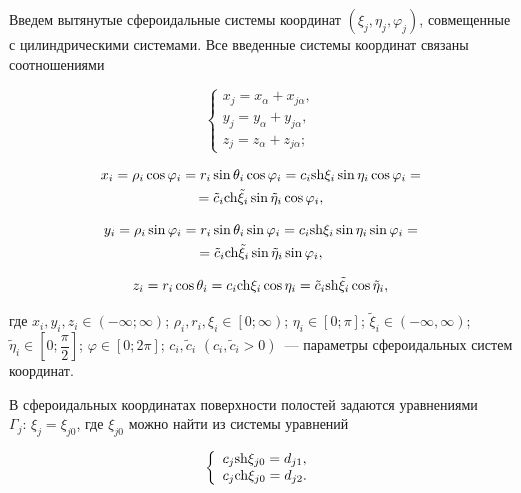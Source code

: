 \begin{russian}
Введем вытянутые сфероидальные системы координат $(\xi_j,\eta_j,\varphi_j)$, совмещенные с цилиндрическими системами. Все введенные системы координат связаны соотношениями 

\begin{equation}
\left\{ {\begin{array}{*{20}{l}}
{{x_j} = {x_\alpha} + {x_{j\alpha}},}\\
{{y_j} = {y_\alpha} + {y_{j\alpha}},}\\
{{z_j} = {z_\alpha} + {z_{j\alpha}};}
\end{array}} \right.
\end{equation}

\begin{multline}
{x_i} = {\rho _i}\cos {\varphi _i} = {r_i}\sin {\theta _i}\cos {\varphi _i} = {c_i}{\mathop{\rm sh}\nolimits} {\xi _i}\sin {\eta _i}\cos {\varphi _i} = \\
= {\tilde c_i}{\mathop{\rm ch}\nolimits} {\tilde \xi _i}\sin {\tilde \eta _i}\cos {\varphi _i},
\end{multline}

\begin{multline}
{y_i} = {\rho _i}\sin {\varphi _i} = {r_i}\sin {\theta _i}\sin {\varphi _i} = {c_i}{\mathop{\rm sh}\nolimits} {\xi _i}\sin {\eta _i}\sin {\varphi _i} = \\
= {\tilde c_i}{\mathop{\rm ch}\nolimits} {\tilde \xi _i}\sin {\tilde \eta _i}\sin {\varphi _i},
\end{multline}

\begin{equation}
{z_i} = {r_i}\cos {\theta _i} = {c_i}{\mathop{\rm ch}\nolimits} {\xi _i}\cos {\eta _i} = {\tilde c_i}{\mathop{\rm sh}\nolimits} {\tilde \xi _i}\cos {\tilde \eta _i},
\end{equation}

\noindent где ${x_i},{y_i},{z_i} \in \left( { - \infty ;\infty } \right)$; ${\rho _i},{r_i},{\xi _i} \in \left[ {\left. {0;\infty } \right)} \right.$; ${\eta _i} \in \left[ {0;\pi } \right]$; ${\tilde \xi _i} \in \left( { - \infty ,\infty } \right)$; ${\tilde \eta _i} \in \left[ {0;\dfrac{\pi }{2}} \right]$; $\varphi  \in \left[ {0;2\pi } \right]$; ${c_i},{\tilde c_i}$ $\left( {{c_i},{{\tilde c}_i} > 0} \right)$~--- параметры сфероидальных систем координат.


В сфероидальных координатах поверхности полостей задаются уравнениями $\Gamma_j:\,\xi_j=\xi_{j0}$, где $\xi_{j0}$ можно найти из системы уравнений

\begin{equation}
\left\{ {\begin{array}{*{20}{l}}
{{c_j}{\mathop{\rm sh}\nolimits} {\xi _{j0}} = {d_{j1}},}\\
{{c_j}{\mathop{\rm ch}\nolimits} {\xi _{j0}} = {d_{j2}}.}
\end{array}} \right.
\end{equation}


\end{russian}
